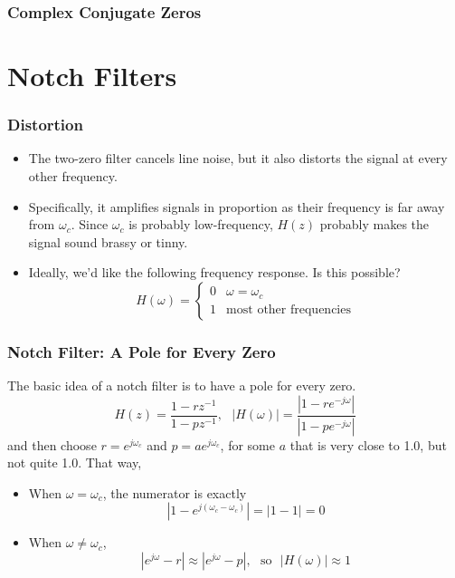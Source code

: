\documentclass{beamer}
\begin{document}
\begin{frame}
  \frametitle{Complex Conjugate Zeros}
  \centerline{}
\end{frame}  

\section[Notch Filters]{Notch Filters}
\setcounter{subsection}{1}

\begin{frame}
  \frametitle{Distortion}

  \begin{itemize}
    \item The two-zero filter cancels line noise, but it also distorts the
      signal at every other frequency.
    \item Specifically, it amplifies signals in proportion as their
      frequency is far away from $\omega_c$.  Since $\omega_c$ is probably
      low-frequency, $H(z)$ probably makes the signal sound brassy or tinny.
    \item Ideally, we'd like the following frequency response.  Is this possible?
      \begin{displaymath}
        H(\omega) = \begin{cases}
          0 & \omega=\omega_c \\
          1 & \mbox{most other frequencies}
        \end{cases}
      \end{displaymath}
  \end{itemize}
\end{frame}

\begin{frame}
  \frametitle{Notch Filter: A Pole for Every Zero}

  The basic idea of a notch filter is to have a pole for every zero.
  \begin{displaymath}
    H(z)=\frac{1-rz^{-1}}{1-pz^{-1}},~~~|H(\omega)|=\frac{|1-re^{-j\omega}|}{|1-pe^{-j\omega}|}
  \end{displaymath}
  and then choose $r=e^{j\omega_c}$ and $p=ae^{j\omega_c}$, for some
  $a$ that is very close to 1.0, but not quite 1.0.  That way,
  \begin{itemize}
  \item When $\omega=\omega_c$, the numerator is exactly
    \begin{displaymath}
      |1-e^{j(\omega_c-\omega_c)}|=|1-1|=0
    \end{displaymath}
  \item When $\omega\ne\omega_c$,
    \begin{displaymath}
      |e^{j\omega}-r|\approx |e^{j\omega}-p|,~~~\mbox{so}~~~|H(\omega)|\approx 1
    \end{displaymath}
  \end{itemize}
\end{frame}
\end{document}
